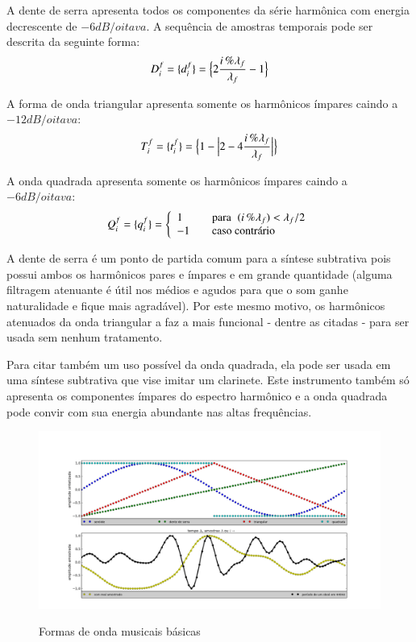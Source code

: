 A dente de serra apresenta todos os componentes da série
harmônica com energia decrescente de $-6dB/oitava$. A sequência de amostras temporais pode ser descrita da seguinte forma:
\begin{equation}\label{denteDeSerra}
     D^f_i=\{ d^f_i \}=\Bigl\{ 2\frac{i\,\%\lambda_f}{\lambda_f} -1 \Bigr\}
\end{equation}

A forma de onda triangular apresenta somente os harmônicos ímpares caindo a $-12dB/oitava$:
\begin{equation}\label{triangular}
     T^f_i=\{ t^f_i \}=\Bigl\{1- \Bigl| 2 - 4\frac{i\,\%\lambda_f}{\lambda_f} \Bigr| \Bigr\}
\end{equation}

A onda quadrada apresenta somente os harmônicos ímpares caindo a $-6dB/oitava$:
\begin{equation}\label{quadrada}
     Q^f_i=\{ q^f_i \}= \left\{
         \begin{array}{l l}
              1 & \quad \text{para} \; \; (i\,\%\lambda_f)   <  \lambda_f /2  \\
              -1 & \quad \text{caso contrário}\\
         \end{array} \right.
\end{equation}

A dente de serra é um ponto de partida comum para a síntese subtrativa pois possui
ambos os harmônicos pares e ímpares e em grande quantidade (alguma filtragem atenuante
é útil nos médios e agudos para que o som ganhe naturalidade e fique mais agradável).
Por este mesmo motivo, os harmônicos atenuados da onda triangular
a faz a mais funcional - dentre as citadas - para ser usada sem nenhum tratamento.

Para citar também um uso possível da onda quadrada, ela pode ser usada em uma síntese
subtrativa que vise imitar um clarinete. Este instrumento também só apresenta os
componentes ímpares do espectro harmônico e a onda quadrada pode convir com sua energia abundante nas altas frequências.



\begin{figure}[h!]
    \centering
    \caption{Formas de onda musicais básicas}
        \includegraphics[width=\textwidth]{figuras/formasDeOnda5}
        \label{fig:formasDeOnda}
\end{figure}



